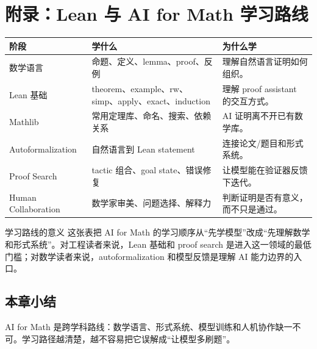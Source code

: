 \section{附录：Lean 与 AI for Math 学习路线}

\noindent\begin{longtable}{p{}p{}p{}}
\toprule
阶段 & 学什么 & 为什么学 \\
\midrule
数学语言 & 命题、定义、lemma、proof、反例 & 理解自然语言证明如何组织。 \\
Lean 基础 & theorem、example、rw、simp、apply、exact、induction & 理解 proof assistant 的交互方式。 \\
Mathlib & 常用定理库、命名、搜索、依赖关系 & AI 证明离不开已有数学库。 \\
Autoformalization & 自然语言到 Lean statement & 连接论文/题目和形式系统。 \\
Proof Search & tactic 组合、goal state、错误修复 & 让模型能在验证器反馈下迭代。 \\
Human Collaboration & 数学家审美、问题选择、解释力 & 判断证明是否有意义，而不只是通过。 \\
\bottomrule
\end{longtable}

\begin{knowledgebox}{学习路线的意义}
这张表把 AI for Math 的学习顺序从“先学模型”改成“先理解数学和形式系统”。对工程读者来说，Lean 基础和 proof search 是进入这一领域的最低门槛；对数学读者来说，autoformalization 和模型反馈是理解 AI 能力边界的入口。
\end{knowledgebox}

\subsection{本章小结}

AI for Math 是跨学科路线：数学语言、形式系统、模型训练和人机协作缺一不可。学习路径越清楚，越不容易把它误解成“让模型多刷题”。

